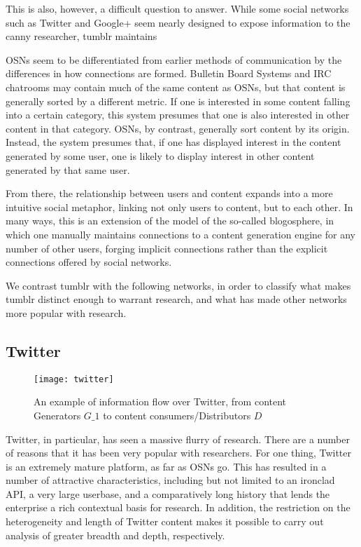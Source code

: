 This is also, however, a difficult question to answer.  While some 
social networks such as Twitter and Google+ seem nearly designed to 
expose information to the canny researcher, tumblr maintains 



OSNs seem to be differentiated from earlier methods of communication by 
the differences in how connections are formed.  Bulletin Board Systems and
IRC chatrooms may contain much of the same content as OSNs, but that 
content is generally sorted by a different metric.  If one is interested in 
some content falling into a certain category, this system presumes that one is 
also interested in other content in that category.  OSNs, by contrast, 
generally sort content by its origin.  Instead, the system presumes that, 
if one has displayed interest in the content generated by some user, one is 
likely to display interest in other content generated by that same user.

From there, the relationship between users and content expands into a 
more intuitive social metaphor, linking not only users to content, but 
to each other.  In many ways, this is an extension of the model of the 
so-called blogosphere, in which one manually maintains connections to 
a content generation engine for any number of other users, forging 
implicit connections rather than the explicit connections offered by 
social networks. 




 We contrast tumblr with the following networks, in order to classify 
what makes tumblr distinct enough to warrant research, and what has 
made other networks more popular with research.

\subsection{Twitter}
\begin{figure}[bht]
\centering
 \texttt{[image: twitter]}
 \caption{An example of information flow over Twitter, from content Generators \(G\_1\) to content consumers/Distributors \(D\)}
 \label{fig:twitter}
\end{figure}
Twitter, in particular, has seen a massive flurry of research.  There 
are a number of reasons that it has been very popular with researchers.  
For one thing, Twitter is an extremely mature platform, as far as OSNs 
go.  This has resulted in a number of attractive characteristics, 
including but not limited to an ironclad API, a very large userbase, 
and a comparatively long history that lends the enterprise a rich 
contextual basis for research.  In addition, the restriction on the 
heterogeneity and length of Twitter content makes it possible to carry 
out analysis of greater breadth and depth, respectively.


